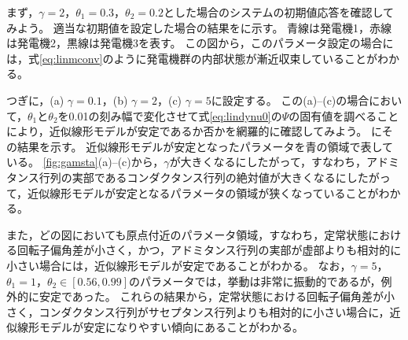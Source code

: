 \documentclass[tombow,dvipdfmx]{corona-a5-1.1}
\begin{document}
\begin{例}[近似線形モデルの数値的な安定性解析]
まず，$\gamma=2$，$\theta_1=0.3$，$\theta_2=0.2$とした場合のシステムの初期値応答を確認してみよう。
適当な初期値を設定した場合の結果をに示す。
青線は発電機1，赤線は発電機2，黒線は発電機3を表す。
この図から，このパラメータ設定の場合には，式\ref{eq:linmconv}のように発電機群の内部状態が漸近収束していることがわかる。

つぎに，(a) $\gamma=0.1$，(b) $\gamma=2$，(c) $\gamma=5$に設定する。
この(a)--(c)の場合において，$\theta_1$と$\theta_2$を0.01の刻み幅で変化させて式\ref{eq:lindynu0}の$\Psi$の固有値を調べることにより，近似線形モデルが安定であるか否かを網羅的に確認してみよう。
にその結果を示す。
近似線形モデルが安定となったパラメータを青の領域で表している。
\ref{fig:gamsta}(a)--(c)から，$\gamma$が大きくなるにしたがって，すなわち，アドミタンス行列の実部であるコンダクタンス行列の絶対値が大きくなるにしたがって，近似線形モデルが安定となるパラメータの領域が狭くなっていることがわかる。

また，どの図においても原点付近のパラメータ領域，すなわち，定常状態における回転子偏角差が小さく，かつ，アドミタンス行列の実部が虚部よりも相対的に小さい場合には，近似線形モデルが安定であることがわかる。
なお，$\gamma=5$，$\theta_1=1$，$\theta_2 \in [0.56,0.99]$のパラメータでは，挙動は非常に振動的であるが，例外的に安定であった。
これらの結果から，定常状態における回転子偏角差が小さく，コンダクタンス行列がサセプタンス行列よりも相対的に小さい場合に，近似線形モデルが安定になりやすい傾向にあることがわかる。
\end{例}
\end{document}
